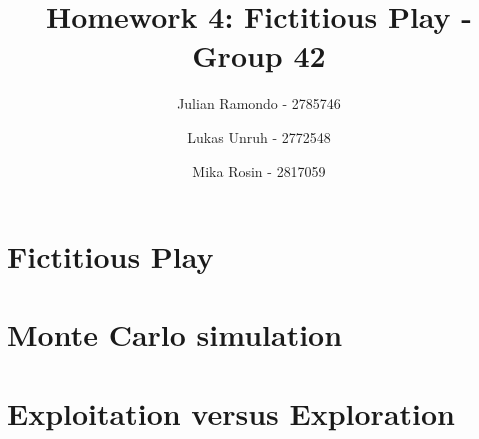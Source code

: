 \documentclass[11pt]{article}
\title{Homework 4: Fictitious Play - Group 42}
\author{Julian Ramondo - 2785746 \and Lukas Unruh - 2772548 \and Mika Rosin - 2817059}
\begin{document}
    \maketitle

    \setcounter{section}{3}

    \section{Fictitious Play}
    

    \section{Monte Carlo simulation}
    
    
    
    

    \section{Exploitation versus Exploration}
    
\end{document}
